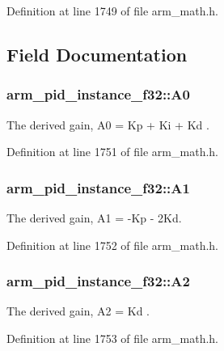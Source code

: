 Definition at line 1749 of file arm\-\_\-math.\-h.



\subsection{Field Documentation}
\hypertarget{structarm__pid__instance__f32_ad7b0bed64915d0a25a3409fa2dc45556}{
\subsubsection[{A0}]{ arm\-\_\-pid\-\_\-instance\-\_\-f32\-::\-A0}}\label{structarm__pid__instance__f32_ad7b0bed64915d0a25a3409fa2dc45556}
The derived gain, A0 = Kp + Ki + Kd . 

Definition at line 1751 of file arm\-\_\-math.\-h.

\hypertarget{structarm__pid__instance__f32_a7def89571c50f7137a213326a396e560}{
\subsubsection[{A1}]{ arm\-\_\-pid\-\_\-instance\-\_\-f32\-::\-A1}}\label{structarm__pid__instance__f32_a7def89571c50f7137a213326a396e560}
The derived gain, A1 = -\/\-Kp -\/ 2\-Kd. 

Definition at line 1752 of file arm\-\_\-math.\-h.

\hypertarget{structarm__pid__instance__f32_a155acf642ba2f521869f19d694cd7fa0}{
\subsubsection[{A2}]{ arm\-\_\-pid\-\_\-instance\-\_\-f32\-::\-A2}}\label{structarm__pid__instance__f32_a155acf642ba2f521869f19d694cd7fa0}
The derived gain, A2 = Kd . 

Definition at line 1753 of file arm\-\_\-math.\-h.

